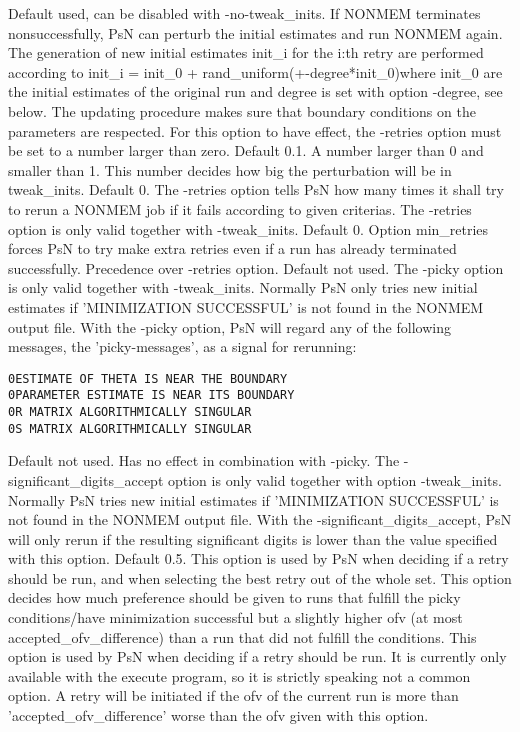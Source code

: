 \begin{optionlist}
Default used, can be disabled with -no-tweak\_inits. If NONMEM terminates nonsuccessfully, PsN can perturb the initial estimates and run NONMEM again. The generation of new initial estimates init\_i for the i:th retry are performed according to init\_i = init\_0 + rand\_uniform(+-degree*init\_0)where init\_0 are the initial estimates of the original run
and degree is set with option -degree, see below. 
The updating procedure makes sure that boundary conditions on the parameters are respected. 
For this option to have effect, the -retries option must be set to a number larger than zero. 
\nextopt
{}
Default 0.1. A number larger than 0 and smaller than 1. This number decides how big the perturbation will
be in tweak\_inits.
\nextopt
{}
Default 0. The -retries option tells PsN how many times it shall try to rerun a NONMEM job if it fails according to given criterias. The -retries option is only valid together with -tweak\_inits. 
\nextopt
{}
Default 0. Option min\_retries forces PsN to try make extra retries even if a run has already terminated successfully. Precedence over -retries option.  
\nextopt
{}
Default not used. The -picky option is only valid together with -tweak\_inits. Normally PsN only tries new initial estimates if 'MINIMIZATION SUCCESSFUL' is not found in the NONMEM output file. With the -picky option, PsN will regard any of the following messages, the 'picky-messages',  as a signal for rerunning:


\begin{verbatim}
0ESTIMATE OF THETA IS NEAR THE BOUNDARY
0PARAMETER ESTIMATE IS NEAR ITS BOUNDARY
0R MATRIX ALGORITHMICALLY SINGULAR
0S MATRIX ALGORITHMICALLY SINGULAR
\end{verbatim}
\nextopt
{}
Default not used. Has no effect in combination with -picky. The -significant\_digits\_accept option is only valid together with option -tweak\_inits. Normally PsN tries new initial estimates if 'MINIMIZATION SUCCESSFUL' is not found in the NONMEM output file. With the -significant\_digits\_accept, PsN will only rerun if the resulting significant digits is lower than the value specified with this option. 
\nextopt
{}
Default 0.5. This option is used by PsN when deciding if a retry should be run, and when selecting the best retry out of the whole set. 
This option decides how much preference should be given to runs that fulfill the picky conditions/have minimization successful 
but a slightly higher ofv (at most accepted\_ofv\_difference) than a run that did not fulfill the conditions.  
\nextopt
{}
This option is used by PsN when deciding if a retry should be run. It is currently only available with the execute program,
so it is strictly speaking not a common option.
A retry will be initiated if the ofv of the current run is more than 'accepted\_ofv\_difference' worse than the ofv
given with this option.
\nextopt
\end{optionlist}

